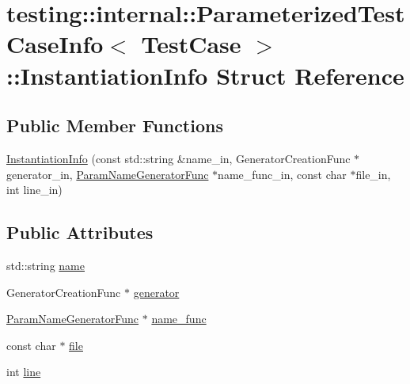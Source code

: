 \hypertarget{structtesting_1_1internal_1_1_parameterized_test_case_info_1_1_instantiation_info}{}\section{testing\+::internal\+::Parameterized\+Test\+Case\+Info$<$ Test\+Case $>$\+::Instantiation\+Info Struct Reference}
\label{structtesting_1_1internal_1_1_parameterized_test_case_info_1_1_instantiation_info}
\subsection*{Public Member Functions}
\begin{DoxyCompactItemize}
\item 
\mbox{\hyperlink{structtesting_1_1internal_1_1_parameterized_test_case_info_1_1_instantiation_info_a80b9f6ae2c4cf66883b73d1e6c290a6b}{Instantiation\+Info}} (const std\+::string \&name\+\_\+in, Generator\+Creation\+Func $\ast$generator\+\_\+in, \mbox{\hyperlink{classtesting_1_1internal_1_1_parameterized_test_case_info_aed6c5184cb8f94cec73e9d7c4b7fa2ce}{Param\+Name\+Generator\+Func}} $\ast$name\+\_\+func\+\_\+in, const char $\ast$file\+\_\+in, int line\+\_\+in)
\end{DoxyCompactItemize}
\subsection*{Public Attributes}
\begin{DoxyCompactItemize}
\item 
std\+::string \mbox{\hyperlink{structtesting_1_1internal_1_1_parameterized_test_case_info_1_1_instantiation_info_a299bc66e22b5c78481fda01ef5a4c73d}{name}}
\item 
Generator\+Creation\+Func $\ast$ \mbox{\hyperlink{structtesting_1_1internal_1_1_parameterized_test_case_info_1_1_instantiation_info_a4c2dbdd0c8f50ff2d5c58c72b364e9a0}{generator}}
\item 
\mbox{\hyperlink{classtesting_1_1internal_1_1_parameterized_test_case_info_aed6c5184cb8f94cec73e9d7c4b7fa2ce}{Param\+Name\+Generator\+Func}} $\ast$ \mbox{\hyperlink{structtesting_1_1internal_1_1_parameterized_test_case_info_1_1_instantiation_info_a78a1508dbcc1718bd3dc6001f45ae2ae}{name\+\_\+func}}
\item 
const char $\ast$ \mbox{\hyperlink{structtesting_1_1internal_1_1_parameterized_test_case_info_1_1_instantiation_info_a2e8aabfbee50377662389fc609222dc4}{file}}
\item 
int \mbox{\hyperlink{structtesting_1_1internal_1_1_parameterized_test_case_info_1_1_instantiation_info_af3f6efd51f0047a3d1f649504c1f3fa1}{line}}
\end{DoxyCompactItemize}



